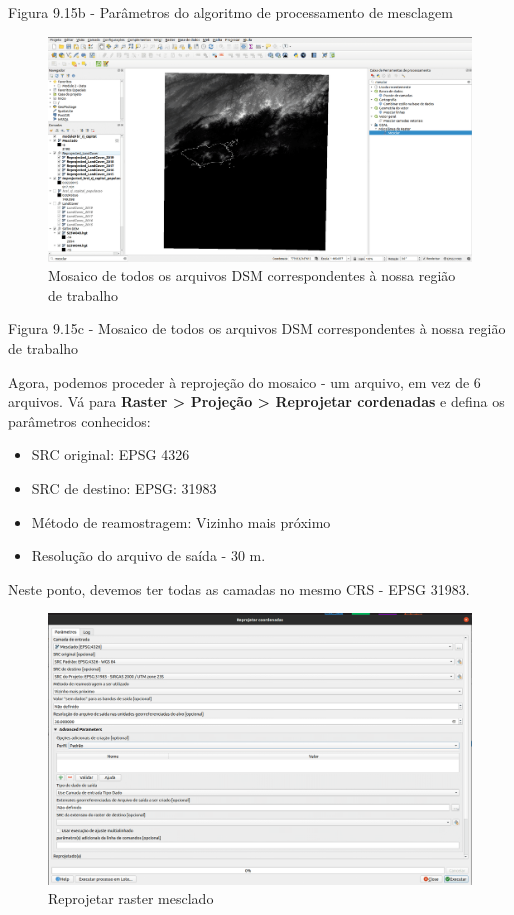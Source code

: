 \documentclass[
]{krantz}
\providecommand{\tightlist}{%
  \setlength{\itemsep}{0pt}\setlength{\parskip}{0pt}}
\begin{document}
Figura 9.15b - Parâmetros do algoritmo de processamento de mesclagem

\begin{figure}
\centering
\includegraphics{media/modulo9/fig915_c.png}
\caption{Mosaico de todos os arquivos DSM correspondentes à nossa região de trabalho}
\end{figure}

Figura 9.15c - Mosaico de todos os arquivos DSM correspondentes à nossa região de trabalho

Agora, podemos proceder à reprojeção do mosaico - um arquivo, em vez de 6 arquivos. Vá para \textbf{Raster \textgreater{} Projeção \textgreater{} Reprojetar cordenadas} e defina os parâmetros conhecidos:

\begin{itemize}
\tightlist
\item
  SRC original: EPSG 4326
\item
  SRC de destino: EPSG: 31983
\item
  Método de reamostragem: Vizinho mais próximo
\item
  Resolução do arquivo de saída - 30 m.
\end{itemize}

Neste ponto, devemos ter todas as camadas no mesmo CRS - EPSG 31983.

\begin{figure}
\centering
\includegraphics{media/modulo9/fig915_d.png}
\caption{Reprojetar raster mesclado}
\end{figure}
\end{document}
